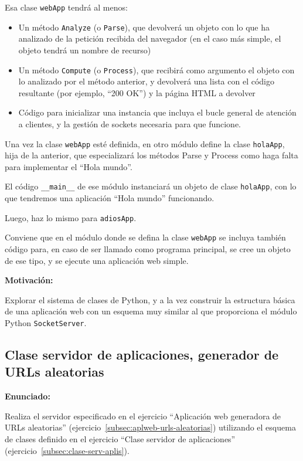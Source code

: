 Esa clase \texttt{webApp} tendrá al menos:

\begin{itemize}
\item Un método \texttt{Analyze} (o \texttt{Parse}), que devolverá un objeto con lo que ha analizado de la petición recibida del navegador (en el caso más simple, el objeto tendrá un nombre de recurso)
\item Un método \texttt{Compute} (o \texttt{Process}), que recibirá como argumento el objeto con lo analizado por el método anterior, y devolverá una lista con el código resultante (por ejemplo, ``200 OK'') y la página HTML a devolver
\item Código para inicializar una instancia que incluya el bucle general de atención a clientes, y la gestión de sockets necesaria para que funcione.
\end{itemize}

Una vez la clase \texttt{webApp} esté definida, en otro módulo define la clase \texttt{holaApp}, hija de la anterior, que especializará los métodos Parse y Process como haga falta para implementar el ``Hola mundo''.

El código \verb|__main__| de ese módulo instanciará un objeto de clase \texttt{holaApp}, con lo que tendremos una aplicación ``Hola mundo'' funcionando.

Luego, haz lo mismo para \texttt{adiosApp}.

Conviene que en el módulo donde se defina la clase \texttt{webApp} se incluya también código para, en caso de ser llamado como programa principal, se cree un objeto de ese tipo, y se ejecute una aplicación web simple.

\textbf{Motivación:}

Explorar el sistema de clases de Python, y a la vez construir la estructura básica de una aplicación web con un esquema muy similar al que proporciona el módulo Python \texttt{SocketServer}.

\subsection{Clase servidor de aplicaciones, generador de URLs aleatorias}
\label{subsec:aplweb-clase-urls-aleatorias}

\textbf{Enunciado:}

Realiza el servidor especificado en el ejercicio ``Aplicación web generadora de URLs aleatorias'' (ejercicio~\ref{subsec:aplweb-urls-aleatorias}) utilizando el esquema de clases definido en el ejercicio ``Clase servidor de aplicaciones'' (ejercicio~\ref{subsec:clase-serv-aplis}).


